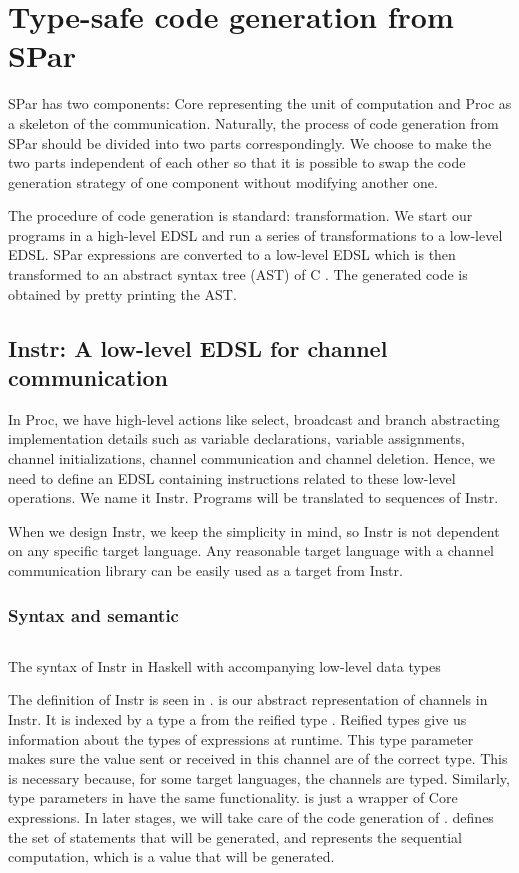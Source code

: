\chapter{Type-safe code generation from SPar} \label{chap:cg}
SPar has two components: Core representing the unit of computation and Proc as a skeleton of the communication. Naturally, the process of code generation from SPar should be divided into two parts correspondingly. We choose to make the two parts independent of each other so that it is possible to swap the code generation strategy of one component without modifying another one.

The procedure of code generation is standard: transformation. We start our programs in a high-level EDSL and run a series of transformations to a low-level EDSL. SPar expressions are converted to a low-level EDSL which is then transformed to an abstract syntax tree (AST) of C \cite{Language}. The generated code is obtained by pretty printing the AST.
\section{Instr: A low-level EDSL for channel communication} \label{codegen:sec:instr}
In Proc, we have high-level actions like select, broadcast and branch abstracting implementation details such as variable declarations, variable assignments, channel initializations, channel communication and channel deletion. Hence, we need to define an EDSL containing instructions related to these low-level operations. We name it Instr. Programs will be translated to sequences of Instr. 

When we design Instr, we keep the simplicity in mind, so Instr is not dependent on any specific target language. Any reasonable target language with a channel communication library can be easily used as a target from Instr.

\subsection{Syntax and semantic}
\begin{listing}
    \inputminted{Haskell}{codegen/instr.hs} 
    \caption{The syntax of Instr in Haskell with accompanying low-level data types}
    \label{codegen:code:instr}
\end{listing}
The definition of Instr is seen in .  is our abstract representation of channels in Instr. It is indexed by a type a from the reified type . Reified types give us information about the types of expressions at runtime. This type parameter makes sure the value sent or received in this channel are of the correct type. This is necessary because, for some target languages, the channels are typed. Similarly, type parameters in  have the same functionality.  is just a wrapper of Core expressions. In later stages, we will take care of the code generation of .  defines the set of statements that will be generated, and  represents the sequential computation, which is a value that will be generated.

